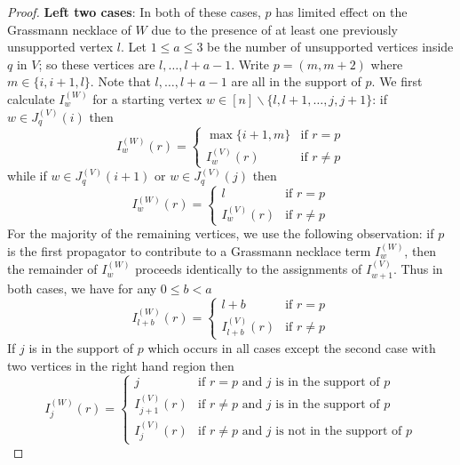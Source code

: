 \documentclass[11pt]{article}
\theoremstyle{remark}
\theoremstyle{definition}
\begin{document}
\begin{proof}
\textbf{Left two cases}: In both of these cases, $p$ has limited effect on the Grassmann necklace of $W$ due to the presence of at least one previously unsupported vertex $l$.  Let $1\leq a\leq 3$ be the number of unsupported vertices inside $q$ in $V$; so these vertices are $l, \ldots, l+a-1$.  Write $p=(m,m+2)$ where $m\in \{i, i+1, l\}$.  Note that $l, \ldots, l+a-1$ are all in the support of $p$.  We first calculate $I^{(W)}_w$ for a starting vertex ${w \in [n]\backslash \{l, l+1, \ldots,j,j+1\}}$: if $w\in J_q^{(V)}(i)$ then
    \[
    I_w^{(W)}(r) =  \begin{cases}
        \max\{i+1, m\} & \text{if } r=p \\
        I_{w}^{(V)}(r) & \text{if } r\neq p
      \end{cases} 
    \]
    while if $w\in J_q^{(V)}(i+1)$ or $w\in J_q^{(V)}(j)$ then
    \[
    I_w^{(W)}(r) =  \begin{cases}
        l & \text{if } r=p \\
        I_{w}^{(V)}(r) & \text{if } r\neq p
      \end{cases} 
      \]
For the majority of the remaining vertices, we use the following observation: if $p$ is the first propagator to contribute to a Grassmann necklace term $I_w^{(W)}$, then the remainder of $I_w^{(W)}$ proceeds identically to the assignments of $I^{(V)}_{w+1}$.  Thus in both cases, we have for any $0\leq b <a$
    \[
    I_{l+b}^{(W)}(r) = \begin{cases}
      l+b & \text{if } r=p\\
      I_{l+b}^{(V)}(r) & \text{if } r\neq p
    \end{cases}
    \]
    If $j$ is in the support of $p$ which occurs in all cases except the second case with two vertices in the right hand region then
     \[
       I_j^{(W)}(r) = \begin{cases}
         j & \text{if $r=p$ and $j$ is in the support of $p$}\\
         I_{j+1}^{(V)}(r) & \text{if $r\neq p$ and $j$ is in the support of $p$}\\
         I_{j}^{(V)}(r) & \text{if $r\neq p$ and $j$ is not in the support of $p$}
       \end{cases}
       \]

\end{proof}
\end{document}
